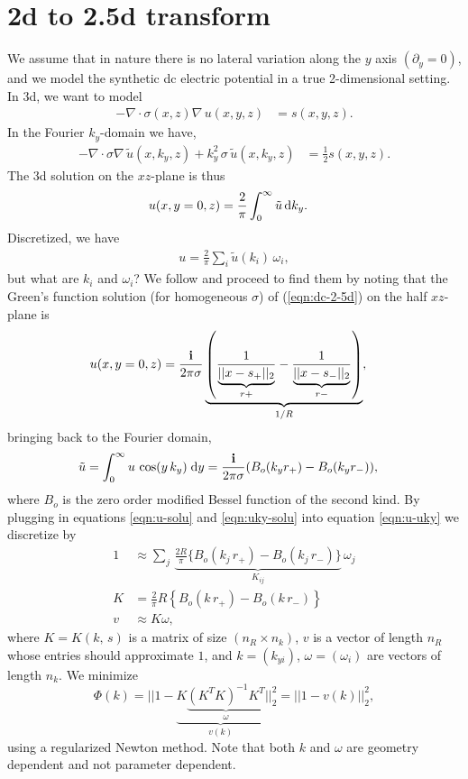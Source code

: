 \documentclass[a4paper,12pt]{article}
\title{}
\author{}
\date{}
\begin{document}
\section*{2d to 2.5d transform}
We assume that in nature there is no lateral variation along the $y$ axis $(\partial_y=0)$, and we model the synthetic dc electric potential in a true 2-dimensional setting. In 3d, we want to model
\begin{align}
-\nabla\cdot\sigma(x,z)\nabla\,u(x,y,z) &= s(x,y,z).
\label{eqn:dc-2-5d}
\end{align}
In the Fourier $k_y$-domain we have,
\begin{align}
-\nabla\cdot\sigma\nabla\,\tilde{u}(x,k_y,z) + k_y^2\,\sigma\,\tilde{u}(x,k_y,z) &= \frac{1}{2}s(x,y,z).
\end{align}
The 3d solution on the $xz$-plane is thus
\begin{align}
u(x,y=0,z) &= \frac{2}{\pi}\int_0^\infty \tilde{u}\,{\rm d}k_y.
\end{align}
Discretized, we have
\begin{align}
u = \frac{2}{\pi}\sum_i \tilde{u}(k_{i})\,\omega_i,
\label{eqn:u-uky}
\end{align}
but what are $k_{i}$ and $\omega_i$? We follow \cite{pidlisecky2008fw2_5d} and proceed to find them by noting that the Green's function solution (for homogeneous $\sigma$) of (\ref{eqn:dc-2-5d}) on the half $xz$-plane is 
\begin{align}
u(x,y=0,z) &= \frac{{\bf i}}{2\pi\sigma}
\underbrace{\left(\frac{1}{\underbrace{||x-s_+||_2}_{r+}} - \frac{1}{\underbrace{||x-s_-||_2}_{r-}}\right)}_{1/R},
\label{eqn:u-solu}
\end{align}
bringing back to the Fourier domain,
\begin{align}
\tilde{u} &= \int_0^\infty u\,\cos(y\,k_y)\;{\rm d}y = \frac{{\bf i}}{2\pi\sigma}(B_o(k_y r_{+}) - B_o(k_y r_{-})),
\label{eqn:uky-solu}
\end{align}
where $B_o$ is the zero order modified Bessel function of the second kind. By plugging in equations \ref{eqn:u-solu} and \ref{eqn:uky-solu} into equation \ref{eqn:u-uky} we discretize by 
\begin{align}
1&\approx \sum_j \, \underbrace{\frac{2R}{\pi}\{B_o(k_j\,r_+) - B_o(k_j\,r_-)\}}_{K_{ij}} \,\omega_j \\
K &= \frac{2}{\pi}R\left\{ B_o(k\,r_+) - B_o(k\,r_-) \right\} \\
v &\approx K\omega,
\label{eqn:Kwv}
\end{align}
where $K=K(k,\,s)$ is a matrix of size $(n_R\times n_k)$, $v$ is a vector of length $n_R$ whose entries should approximate $1$, and $k=(k_{yi})$, $\omega=(\omega_i)$ are vectors of length $n_k$. We minimize
\[
\Phi(k) = || 1 - \underbrace{K\underbrace{(K^TK)^{-1}K^T}_{\omega}}_{v(k)} ||_2^2 = 
||1-v(k)||_2^2,
\]
using a regularized Newton method. Note that both $k$ and $\omega$ are geometry dependent and not parameter dependent.
\end{document}
